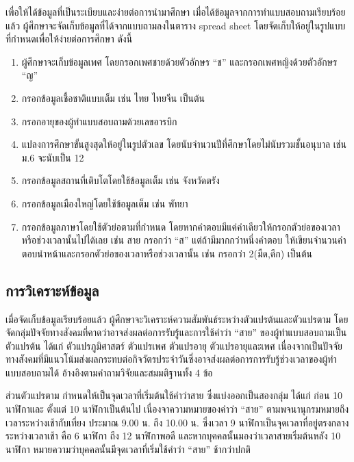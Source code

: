 \documentclass[a4paper]{article}
\begin{document}
    เพื่อให้ได้ข้อมูลที่เป็นระเบียบและง่ายต่อการนำมาศึกษา เมื่อได้ข้อมูลจากการทำแบบสอบถามเรียบร้อยแล้ว ผู้ศึกษาจะจัดเก็บข้อมูลที่ได้จากแบบถามลงในตาราง spread sheet โดยจัดเก็บให้อยู่ในรูปแบบที่กำหนดเพื่อให้ง่ายต่อการศึกษา ดังนี้
    \begin{enumerate}
        \item ผู้ศึกษาจะเก็บข้อมูลเพศ โดยกรอกเพศชายด้วยตัวอักษร “ช” และกรอกเพศหญิงด้วยตัวอักษร “ญ”
        \item กรอกข้อมูลเชื้อชาติแบบเต็ม เช่น ไทย ไทยจีน เป็นต้น
        \item กรอกอายุของผู้ทำแบบสอบถามด้วยเลขอารบิก
        \item แปลงการศึกษาขั้นสูงสุดให้อยู่ในรูปตัวเลข โดยนับจำนวนปีที่ศึกษาโดยไม่นับรวมชั้นอนุบาล เช่น ม.6 จะนับเป็น 12
        \item กรอกข้อมูลสถานที่เติบโตโดยใช้ข้อมูลเต็ม เช่น จังหวัดตรัง
        \item กรอกข้อมูลเมืองใหญ่โดยใช้ข้อมูลเต็ม เช่น พัทยา
        \item  กรอกข้อมูลภาษาโดยใช้ตัวย่อตามที่กำหนด โดยหากคำตอบมีแค่คำเดียวให้กรอกตัวย่อของเวลาหรือช่วงเวลานั้นไปได้เลย  เช่น สาย กรอกว่า “ส” แต่ถ้ามีมากกว่าหนึ่งคำตอบ ให้เขียนจำนวนคำตอบนำหน้าและกรอกตัวย่อของเวลาหรือช่วงเวลานั้น เช่น กรอกว่า 2(มืด,ดึก) เป็นต้น
    \end{enumerate}
\subsection{การวิเคราะห์ข้อมูล}
    เมื่อจัดเก็บข้อมูลเรียบร้อยแล้ว ผู้ศึกษาจะวิเคราะห์ความสัมพันธ์ระหว่างตัวแปรต้นและตัวแปรตาม โดยจัดกลุ่มปัจจัยทางสังคมที่คาดว่าอาจส่งผลต่อการรับรู้และการใช้คำว่า “สาย” ของผู้ทำแบบสอบถามเป็นตัวแปรต้น ได้แก่ ตัวแปรภูมิศาสตร์ ตัวแปรเพศ ตัวแปรอายุ ตัวแปรอายุและเพศ เนื่องจากเป็นปัจจัยทางสังคมที่มีแนวโน้มส่งผลกระทบต่อกิจวัตรประจำวันซึ่งอาจส่งผลต่อการการรับรู้ช่วงเวลาของผู้ทำแบบสอบถามได้ อ้างอิงตามคำถามวิจัยและสมมติฐานทั้ง 4 ข้อ

    ส่วนตัวแปรตาม กำหนดให้เป็นจุดเวลาที่เริ่มต้นใช้คำว่าสาย ซึ่งแบ่งออกเป็นสองกลุ่ม ได้แก่ ก่อน 10 นาฬิกาและ ตั้งแต่ 10 นาฬิกาเป็นต้นไป เนื่องจาความหมายของคำว่า “สาย” ตามพจนานุกรมหมายถึง เวลาระหว่างเช้ากับเที่ยง ประมาณ 9.00 น. ถึง 10.00 น. ซึ่งเวลา 9 นาฬิกาเป็นจุดเวลาที่อยู่ตรงกลางระหว่างเวลาเช้า คือ 6 นาฬิกา ถึง 12 นาฬิกาพอดี และหากบุคคลนั้นมองว่าเวลาสายเริ่มต้นหลัง 10 นาฬิกา หมายความว่าบุคคลนั้นมีจุดเวลาที่เริ่มใช้คำว่า “สาย” ช้ากว่าปกติ
\end{document}
